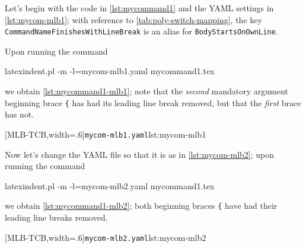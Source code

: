 \documentclass[10pt]{article}
\begin{document}
 \begin{example}
 Let's begin with the code in \cref{lst:mycommand1} and the YAML settings in
 \cref{lst:mycom-mlb1}; with reference to \vref{tab:poly-switch-mapping}, the key
 \texttt{CommandNameFinishesWithLineBreak} is an alias for \texttt{BodyStartsOnOwnLine}.


 Upon running the command  

 \begin{commandshell}
latexindent.pl -m -l=mycom-mlb1.yaml mycommand1.tex
\end{commandshell}

 we obtain \cref{lst:mycommand1-mlb1}; note that the \emph{second} mandatory argument
 beginning brace \lstinline!{! has had its leading line break removed, but that the
 \emph{first} brace has not.

 \begin{cmhtcbraster}[
   raster force size=false,
   raster column 1/.style={add to width=-1cm},
  ]
  [MLB-TCB,width=.6\textwidth]{\texttt{mycom-mlb1.yaml}}{lst:mycom-mlb1}
 \end{cmhtcbraster}
 \end{example}

 \begin{example}
 Now let's change the YAML file so that it is as in \cref{lst:mycom-mlb2}; upon running
 the command

 \begin{commandshell}
latexindent.pl -m -l=mycom-mlb2.yaml mycommand1.tex
\end{commandshell}

 we obtain \cref{lst:mycommand1-mlb2}; both beginning braces \lstinline!{! have had their
 leading line breaks removed.

 \begin{cmhtcbraster}[
   raster force size=false,
   raster column 1/.style={add to width=-1cm},
  ]
  [MLB-TCB,width=.6\textwidth]{\texttt{mycom-mlb2.yaml}}{lst:mycom-mlb2}
 \end{cmhtcbraster}
 \end{example}
\end{document}
